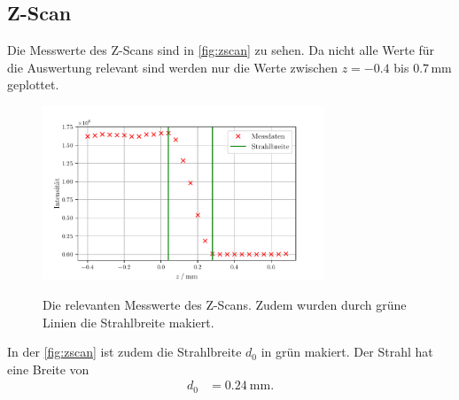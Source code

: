\subsection{Z-Scan}
Die Messwerte des Z-Scans sind in \autoref{fig:zscan} zu sehen.
Da nicht alle Werte für die Auswertung relevant sind werden nur die Werte zwischen $z = -0.4$ bis $0.7 \, \si{\milli\meter}$ geplottet.
\begin{figure}
    \centering
    \caption{Die relevanten Messwerte des Z-Scans. Zudem wurden durch grüne Linien die Strahlbreite makiert.}
    \includegraphics[width=0.75\textwidth]{content/data/zscan.pdf}
    \label{fig:zscan}
\end{figure}
In der \autoref{fig:zscan} ist zudem die Strahlbreite $d_0$ in grün makiert.
Der Strahl hat eine Breite von 
\begin{align*}
    d_0 &= \SI{0.24}{\milli\meter}.
\end{align*}
\FloatBarrier
